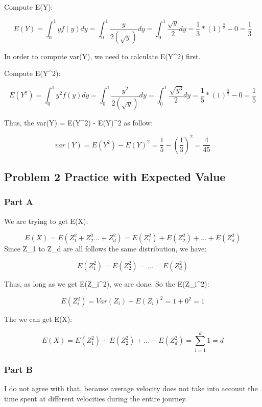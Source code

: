 \documentclass[
]{article}
\begin{document}
Compute E(Y):

\[
E(Y) = \int_{0}^{1} yf(y)dy = \int_{0}^{1} \frac{y}{2(\sqrt{y})}dy =\int_{0}^{1}  \frac{\sqrt{y}}{2}dy = \frac{1}{3}*(1)^\frac{3}{2} - 0 = \frac{1}{3}
\]

In order to compute var(Y), we need to calculate E(Y\^{}2) first.

Compute E(Y\^{}2):

\[
E(Y^2) = \int_{0}^{1} y^2f(y)dy = \int_{0}^{1} \frac{y^2}{2(\sqrt{y})}dy =\int_{0}^{1}  \frac{\sqrt{y^3}}{2}dy = \frac{1}{5}*(1)^\frac{5}{2} - 0 = \frac{1}{5}
\]

Thus, the var(Y) = E(Y\^{}2) - E(Y)\^{}2 as follow:

\[
var(Y) = E(Y^2)- E(Y)^2 = \frac{1}{5} - (\frac{1}{3})^2 = \frac{4}{45}
\]

\hypertarget{problem-2-practice-with-expected-value}{%
\subsection{Problem 2 Practice with Expected Value}\label{problem-2-practice-with-expected-value}}

\hypertarget{part-a-7}{%
\subsubsection{Part A}\label{part-a-7}}

We are trying to get E(X):

\[
E(X) = E(Z_1^2+Z_2^2...+Z_d^2) = E(Z_1^2)+E(Z_2^2)+...+E(Z_d^2)
\] Since Z\_1 to Z\_d are all follows the same distribution, we have:

\[
E(Z_1^2) = E(Z_2^2) = ... = E(Z_d^2)
\]

Thus, as long as we get E(Z\_i\^{}2), we are done. So the E(Z\_i\^{}2):

\[
E(Z_i^2) = Var(Z_i) + E(Z_i)^2 = 1 + 0^2 = 1
\]

The we can get E(X):

\[
E(X) =E(Z_1^2)+E(Z_2^2)+...+E(Z_d^2) = \sum_{i = 1}^{d} 1 = d
\]

\hypertarget{part-b-7}{%
\subsubsection{Part B}\label{part-b-7}}

I do not agree with that, because average velocity does not take into account the time spent at different velocities during the entire journey.
\end{document}
